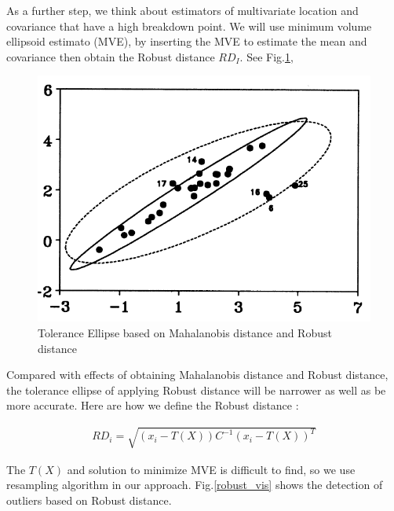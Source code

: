\documentclass[12pt,DIV14,BCOR12mm,a4paper,footinclude=false,headinclude,parskip=half-,twoside,openright,cleardoublepage=empty,toc=index,bibliography=totoc,listof=totoc]{scrreprt}
\numberwithin{equation}{chapter}
\begin{document}
As a further step, we think about estimators of multivariate location and covariance that have a high breakdown point. We will use minimum volume ellipsoid estimato (MVE), by inserting the MVE to estimate the mean and covariance then obtain the Robust distance $RD_{I}$. See Fig.\ref{ellipse_vis},

\begin{figure}
	\centering
	\includegraphics[scale=0.6]{image/tolerance_ellipse}
	\caption{Tolerance Ellipse based on Mahalanobis distance and Robust distance}
	\label{ellipse_vis}
\end{figure}

 Compared with effects of obtaining Mahalanobis distance and Robust distance, the tolerance ellipse of applying Robust distance will be narrower as well as be more accurate. Here are how we define the Robust distance :
 
 \begin{align}
 RD_i=\sqrt{(x_{i}-T(X))C^{-1}(x_{i}-T(X))^T}
 \end{align}
 
  The $T(X)$ and  solution to minimize MVE is difficult to find, so we use resampling algorithm in our approach. Fig.\ref{robust_vis} shows the detection of outliers based on Robust distance. 
  
\end{document}
